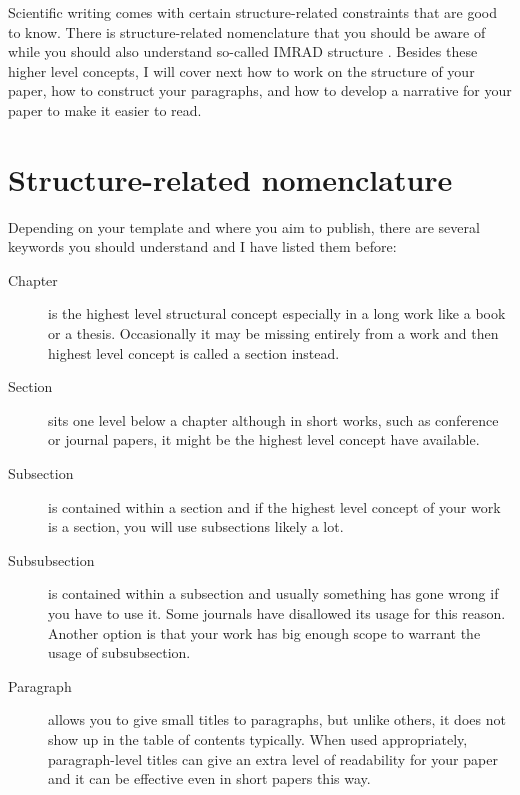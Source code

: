Scientific writing comes with certain structure-related constraints that are good to know.
There is structure-related nomenclature that you should be aware of while you should also understand so-called IMRAD structure \citep{wu2011improving}.
Besides these higher level concepts, I will cover next how to work on the structure of your paper, how to construct your paragraphs, and how to develop a narrative for your paper to make it easier to read.


\section{Structure-related nomenclature}

Depending on your template and where you aim to publish, there are several keywords you should understand and I have listed them before:

\begin{description}
    \item[Chapter] is the highest level structural concept especially in a long work like a book or a thesis. Occasionally it may be missing entirely from a work and then highest level concept is called a section instead. %
    \item[Section] sits one level below a chapter although in short works, such as conference or journal papers, it might be the highest level concept have available. %
    \item[Subsection] is contained within a section and if the highest level concept of your work is a section, you will use subsections likely a lot. %
    \item[Subsubsection] is contained within a subsection and usually something has gone wrong if you have to use it. Some journals have disallowed its usage for this reason. Another option is that your work has big enough scope to warrant the usage of subsubsection. %
    \item[Paragraph] allows you to give small titles to paragraphs, but unlike others, it does not show up in the table of contents typically. When used appropriately, paragraph-level titles can give an extra level of readability for your paper and it can be effective even in short papers this way. %
\end{description}

